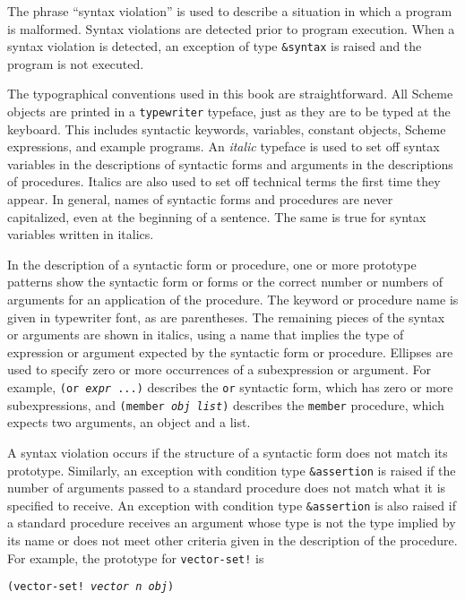 \label{intro_s56}The phrase ``syntax violation'' is used to
describe a situation in which a program is malformed.
Syntax violations are detected prior to program execution.
When a syntax violation is detected, an exception of type \texttt{\&{}syntax}
is raised and the program is not executed.


The typographical conventions used in this book are straightforward.
All Scheme objects are printed in a \texttt{typewriter} typeface, just as they
are to be typed at the keyboard.
This includes syntactic keywords, variables, constant
objects, Scheme expressions, and example programs.
An \textit{italic} typeface is used to set off syntax variables in
the descriptions of syntactic forms and arguments in the descriptions of
procedures.
Italics are also used to set off technical terms the first time they
appear.
In general, names of syntactic forms and procedures are never
capitalized, even at the beginning of a sentence.
The same is true for syntax variables written in italics.


In the description of a syntactic form or procedure, one or more prototype
patterns show the syntactic form or forms or the correct number or numbers
of arguments for an application of the procedure.
The keyword or procedure name is given in typewriter font,
as are parentheses.
The remaining pieces of the syntax or arguments are shown in italics,
using a name that implies the type of expression or argument expected
by the syntactic form or procedure.
Ellipses are used to specify
zero or more occurrences of a subexpression or argument.
For example, \texttt{(or \textit{expr} ...)} describes the \texttt{or}
syntactic form, which has zero or more subexpressions, and
\texttt{(member \textit{obj} \textit{list})} describes the \texttt{member}
procedure, which expects two arguments, an object and a list.


A syntax violation occurs if the structure of a syntactic form does
not match its prototype.
Similarly, an exception with condition type \texttt{\&{}assertion} is raised
if the number of arguments passed to a standard procedure does not match
what it is specified to receive.
An exception with condition type \texttt{\&{}assertion} is also raised if a
standard procedure receives an argument whose type is not the
type implied by its name or does not meet other criteria given in
the description of the procedure.
For example, the prototype for \texttt{vector-set!} is


\texttt{(vector-set! \textit{vector} \textit{n} \textit{obj})}

